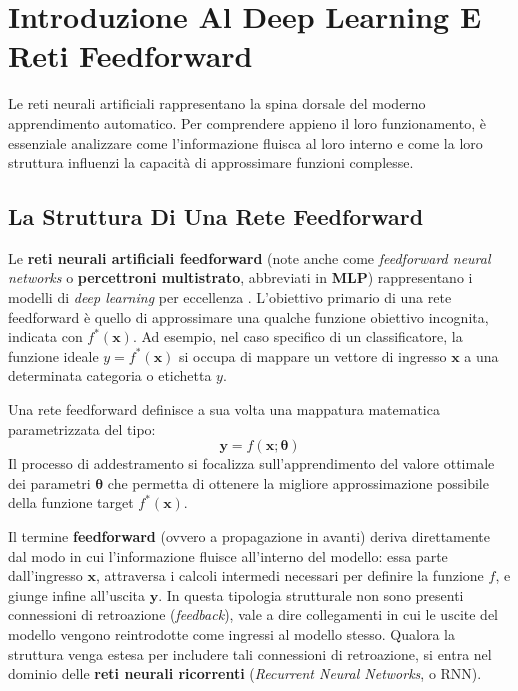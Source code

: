 ﻿\documentclass[11pt, a4paper]{article}
\author{Francesco Lo Verde}
\begin{document}
\section{Introduzione Al Deep Learning E Reti Feedforward}

Le reti neurali artificiali rappresentano la spina dorsale del moderno apprendimento automatico. Per comprendere appieno il loro funzionamento, è essenziale analizzare come l'informazione fluisca al loro interno e come la loro struttura influenzi la capacità di approssimare funzioni complesse.


\subsection{La Struttura Di Una Rete Feedforward}

Le \textbf{reti neurali artificiali feedforward} (note anche come \emph{feedforward neural networks} o \textbf{percettroni multistrato}, abbreviati in \textbf{MLP}) rappresentano i modelli di \emph{deep learning} per eccellenza \cite{goodfellow2016deep}. L'obiettivo primario di una rete feedforward è quello di approssimare una qualche funzione obiettivo incognita, indicata con $f^*(\bm{x})$. Ad esempio, nel caso specifico di un classificatore, la funzione ideale $y = f^*(\bm{x})$ si occupa di mappare un vettore di ingresso $\bm{x}$ a una determinata categoria o etichetta $y$.

Una rete feedforward definisce a sua volta una mappatura matematica parametrizzata del tipo:
\[
\bm{y} = f(\bm{x}; \bm{\theta})
\]
Il processo di addestramento si focalizza sull'apprendimento del valore ottimale dei parametri $\bm{\theta}$ che permetta di ottenere la migliore approssimazione possibile della funzione target $f^*(\bm{x})$.

Il termine \textbf{feedforward} (ovvero a propagazione in avanti) deriva direttamente dal modo in cui l'informazione fluisce all'interno del modello: essa parte dall'ingresso $\bm{x}$, attraversa i calcoli intermedi necessari per definire la funzione $f$, e giunge infine all'uscita $\bm{y}$. In questa tipologia strutturale non sono presenti connessioni di retroazione (\emph{feedback}), vale a dire collegamenti in cui le uscite del modello vengono reintrodotte come ingressi al modello stesso. Qualora la struttura venga estesa per includere tali connessioni di retroazione, si entra nel dominio delle \textbf{reti neurali ricorrenti} (\emph{Recurrent Neural Networks}, o RNN).
\end{document}
